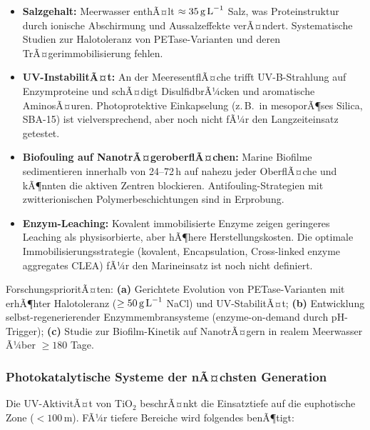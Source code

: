 ﻿\documentclass[12pt,a4paper]{article}
\theoremstyle{definition}
\theoremstyle{remark}
\begin{document}
\begin{itemize}
  \item \textbf{Salzgehalt:} Meerwasser enthÃ¤lt $\approx 35\,\text{g\,L}^{-1}$
        Salz, was Proteinstruktur durch ionische Abschirmung und Aussalzeffekte
        verÃ¤ndert. Systematische Studien zur Halotoleranz von
        PETase-Varianten und deren TrÃ¤gerimmobilisierung fehlen.
  \item \textbf{UV-InstabilitÃ¤t:} An der MeeresentflÃ¤che trifft UV-B-Strahlung
        auf Enzymproteine und schÃ¤digt DisulfidbrÃ¼cken und aromatische AminosÃ¤uren.
        Photoprotektive Einkapselung (z.\,B.\ in mesoporÃ¶ses Silica, SBA-15)
        ist vielversprechend, aber noch nicht fÃ¼r den Langzeiteinsatz getestet.
  \item \textbf{Biofouling auf NanotrÃ¤geroberflÃ¤chen:} Marine Biofilme
        sedimentieren innerhalb von 24--72\,h auf nahezu jeder OberflÃ¤che
        und kÃ¶nnten die aktiven Zentren blockieren. Antifouling-Strategien
        mit zwitterionischen Polymerbeschichtungen sind in Erprobung.
  \item \textbf{Enzym-Leaching:} Kovalent immobilisierte Enzyme zeigen
        geringeres Leaching als physisorbierte, aber hÃ¶here Herstellungskosten.
        Die optimale Immobilisierungsstrategie (kovalent, Encapsulation,
        Cross-linked enzyme aggregates CLEA) fÃ¼r den Marineinsatz ist
        noch nicht definiert.
\end{itemize}

ForschungsprioritÃ¤ten: \textbf{(a)} Gerichtete Evolution von PETase-Varianten
mit erhÃ¶hter Halotoleranz ($\geq 50\,\text{g\,L}^{-1}$ NaCl) und UV-StabilitÃ¤t;
\textbf{(b)} Entwicklung selbst-regenerierender Enzymmembransysteme
(enzyme-on-demand durch pH-Trigger); \textbf{(c)} Studie zur Biofilm-Kinetik
auf NanotrÃ¤gern in realem Meerwasser Ã¼ber $\geq 180$ Tage.

\subsubsection{Photokatalytische Systeme der nÃ¤chsten Generation}

Die UV-AktivitÃ¤t von TiO$_2$ beschrÃ¤nkt die Einsatztiefe auf die euphotische
Zone ($< 100\,\text{m}$). FÃ¼r tiefere Bereiche wird folgendes benÃ¶tigt:
\end{document}
